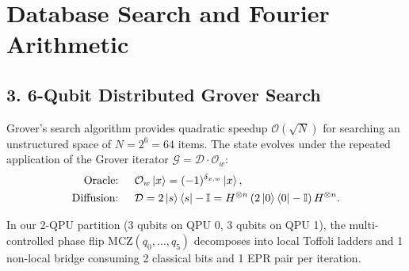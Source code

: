 \section{Database Search and Fourier Arithmetic}
\label{sec:distributed_grover_qft}

\subsection{3. 6-Qubit Distributed Grover Search}
Grover's search algorithm provides quadratic speedup $\mathcal{O}(\sqrt{N})$ for searching an unstructured space of $N = 2^6 = 64$ items. The state evolves under the repeated application of the Grover iterator $\mathcal{G} = \mathcal{D} \cdot \mathcal{O}_w$:
\begin{align}
    \text{Oracle: } \quad & \mathcal{O}_w \ket{x} = (-1)^{\delta_{x, w}} \ket{x}, \\
    \text{Diffusion: } \quad & \mathcal{D} = 2\ket{s}\bra{s} - \mathbb{I} = H^{\otimes n} \left( 2\ket{0}\bra{0} - \mathbb{I} \right) H^{\otimes n}.
\end{align}

In our 2-QPU partition (3 qubits on QPU 0, 3 qubits on QPU 1), the multi-controlled phase flip $\text{MCZ}(q_0, \dots, q_5)$ decomposes into local Toffoli ladders and 1 non-local bridge consuming 2 classical bits and 1 EPR pair per iteration.

